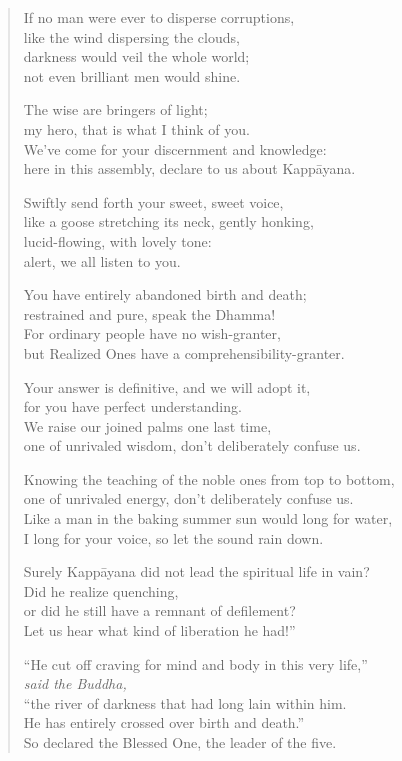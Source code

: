 \documentclass[12pt,openany]{book}%
\newcommand*{\scspeaker}[1]{\hspace{2em}\textit{#1}}
\begin{document}
\begin{verse}
If no man were ever to disperse corruptions, \\
like the wind dispersing the clouds, \\
darkness would veil the whole world; \\
not even brilliant men would shine. 

The wise are bringers of light; \\
my hero, that is what I think of you. \\
We’ve come for your discernment and knowledge: \\
here in this assembly, declare to us about \textsanskrit{Kappāyana}. 

Swiftly send forth your sweet, sweet voice, \\
like a goose stretching its neck, gently honking, \\
lucid-flowing, with lovely tone: \\
alert, we all listen to you. 

You have entirely abandoned birth and death; \\
restrained and pure, speak the Dhamma! \\
For ordinary people have no wish-granter, \\
but Realized Ones have a comprehensibility-granter. 

Your answer is definitive, and we will adopt it, \\
for you have perfect understanding. \\
We raise our joined palms one last time, \\
one of unrivaled wisdom, don’t deliberately confuse us. 

Knowing the teaching of the noble ones from top to bottom, \\
one of unrivaled energy, don’t deliberately confuse us. \\
Like a man in the baking summer sun would long for water, \\
I long for your voice, so let the sound rain down. 

Surely \textsanskrit{Kappāyana} did not lead the spiritual life in vain? \\
Did he realize quenching, \\
or did he still have a remnant of defilement? \\
Let us hear what kind of liberation he had!” 

“He cut off craving for mind and body in this very life,” \\
\scspeaker{said the Buddha, }\\
“the river of darkness that had long lain within him. \\
He has entirely crossed over birth and death.” \\
So declared the Blessed One, the leader of the five. 


\end{verse}
\end{document}
